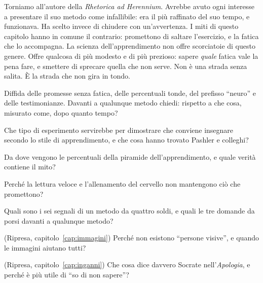 Torniamo all'autore della \emph{Rhetorica ad Herennium}. Avrebbe avuto
ogni interesse a presentare il suo metodo come infallibile: era il più
raffinato del suo tempo, e funzionava. Ha scelto invece di chiudere con
un'avvertenza. I miti di questo capitolo hanno in comune il
contrario: promettono di saltare l'esercizio, e la fatica che lo
accompagna. La scienza dell'apprendimento non offre scorciatoie di
questo genere. Offre qualcosa di più modesto e di più prezioso: sapere
\emph{quale} fatica vale la pena fare, e smettere di sprecare quella
che non serve. Non è una strada senza salita. È la strada che non gira
in tondo.

\begin{daricordare}
Diffida delle promesse senza fatica, delle percentuali tonde, del
prefisso \enquote{neuro} e delle testimonianze. Davanti a qualunque
metodo chiedi: rispetto a che cosa, misurato come, dopo quanto
tempo?
\end{daricordare}

\begin{domande}
  \item Che tipo di esperimento servirebbe per dimostrare che conviene
        insegnare secondo lo stile di apprendimento, e che cosa hanno
        trovato Pashler e colleghi?
  \item Da dove vengono le percentuali della piramide
        dell'apprendimento, e quale verità contiene il mito?
  \item Perché la lettura veloce e l'allenamento del cervello non
        mantengono ciò che promettono?
  \item Quali sono i sei segnali di un metodo da quattro soldi, e quali
        le tre domande da porsi davanti a qualunque metodo?
  \item (Ripresa, capitolo~\ref{cap:immagini}) Perché non esistono
        \enquote{persone visive}, e quando le immagini aiutano tutti?
  \item (Ripresa, capitolo~\ref{cap:inganni}) Che cosa dice davvero
        Socrate nell'\emph{Apologia}, e perché è più utile di \enquote{so
        di non sapere}?
\end{domande}

